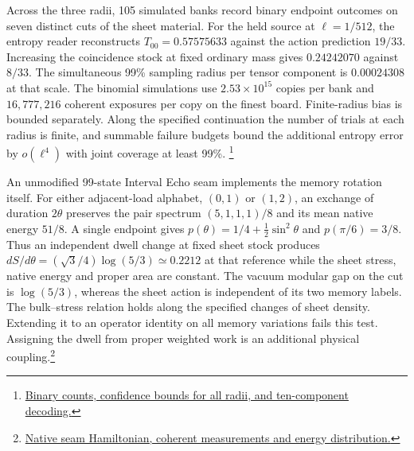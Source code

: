 \documentclass[11pt]{article}
\begin{document}
Across the three radii, 105 simulated banks record binary endpoint outcomes
on seven distinct cuts of the sheet material. For the held source at
$\ell=1/512$, the entropy reader reconstructs $T_{00}=0.57575633$ against
the action prediction $19/33$. Increasing the coincidence stock at fixed
ordinary mass gives $0.24242070$ against $8/33$. The simultaneous 99\%
sampling radius per tensor component is $0.00024308$ at that scale.
The binomial simulations use $2.53\times10^{15}$ copies per bank and
$16{,}777{,}216$ coherent exposures per copy on the finest board.
Finite-radius bias is bounded separately. Along the specified continuation
the number of trials at each radius is finite, and summable failure budgets
bound the additional entropy error by $o(\ell^4)$ with joint coverage at
least 99\%.
\footnote{\href{https://github.com/FloatingPragma/observer-patch-holography/tree/main/model/candidate_laws/interval_echo_partition_repair/published_strings/counted_tower}{Binary counts, confidence bounds for all radii, and ten-component decoding.}}

An unmodified 99-state Interval Echo seam implements the memory rotation
itself. For either adjacent-load alphabet, $(0,1)$ or $(1,2)$, an exchange
of duration $2\theta$ preserves the pair spectrum $(5,1,1,1)/8$ and its
mean native energy $51/8$. A single endpoint gives
$p(\theta)=1/4+\tfrac12\sin^2\theta$ and $p(\pi/6)=3/8$.
Thus an independent dwell change at fixed sheet stock produces
$dS/d\theta=(\sqrt3/4)\log(5/3)\simeq0.2212$ at that reference while
the sheet stress, native energy and proper area are constant. The
vacuum modular gap on the cut is $\log(5/3)$, whereas the sheet action
is independent of its two memory labels. The bulk--stress relation holds
along the specified changes of sheet density. Extending it to an
operator identity on all memory variations fails this test. Assigning
the dwell from proper weighted work is an additional physical
coupling.\footnote{\href{https://github.com/FloatingPragma/observer-patch-holography/blob/main/model/candidate_laws/interval_echo_partition_repair/published_strings/NATIVE_PAIR.md}{Native seam Hamiltonian, coherent measurements and energy distribution.}}
\end{document}
